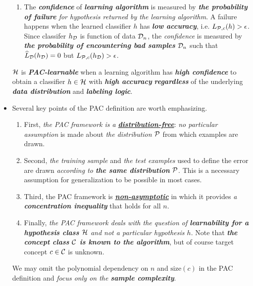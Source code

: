 \documentclass[11pt]{article}
\begin{document}
\begin{itemize}
\begin{remark}
\begin{enumerate}
\item The \emph{\textbf{confidence}} of \emph{\textbf{learning algorithm}} is measured by \emph{\textbf{the probability of failure} for hypothesis returned by the learning algorithm}. A failure happens when the learned classifier $h$ has \emph{\textbf{low accuracy}}, i.e. $L_{{\mathcal P}, c}(h) > \epsilon$. Since classifer $h_{{\mathcal D}}$ is function of data ${\mathcal D}_n$, the \emph{confidence} is measured by \emph{\textbf{the probability of encountering bad samples}} ${\mathcal D}_n$ such that $\widehat{L}_{{\mathcal D}}(h_{{\mathcal D}}) = 0$ but $L_{{\mathcal P}, c}(h_{{\mathcal D}}) > \epsilon$.
\end{enumerate}
${\mathcal H}$ is \emph{\textbf{PAC-learnable}} when a learning algorithm has \emph{\textbf{high confidence}} to obtain a classifier $h \in {\mathcal H}$ with \emph{\textbf{high accuracy}} \emph{\textbf{regardless}} of the underlying \emph{\textbf{data distribution}} and \emph{\textbf{labeling logic}}.
\end{remark}


\item \begin{remark}
Several key points of the PAC definition are worth emphasizing. 
\begin{enumerate}
\item First, \emph{the PAC framework is a \underline{\textbf{distribution-free}}}: \emph{no particular assumption} is made about \emph{the distribution ${\mathcal P}$} from which examples are drawn. 

\item Second, \emph{the training sample} and \emph{the test examples} used to define the error are drawn \emph{according to \textbf{the same distribution} ${\mathcal P}$}. This is a necessary assumption for generalization to be possible in most cases.

\item Third, the PAC framework is \underline{\emph{\textbf{non-asymptotic}}} in which it provides \emph{a \textbf{concentration inequality}} that holds for all $n$. %

\item Finally, \emph{the PAC framework deals with the question of \textbf{learnability for a hypothesis class} ${\mathcal H}$ and not a particular hypothesis $h$}. Note that \emph{\textbf{the concept class ${\mathcal C}$ is known to the algorithm}}, but of course target concept $c \in {\mathcal C}$ is unknown.
\end{enumerate}
We may omit the polynomial dependency on $n$ and $\text{size}(c)$ in the PAC definition and \emph{focus only on the \textbf{sample complexity}}.
\end{remark}
\end{itemize}
\end{document}
